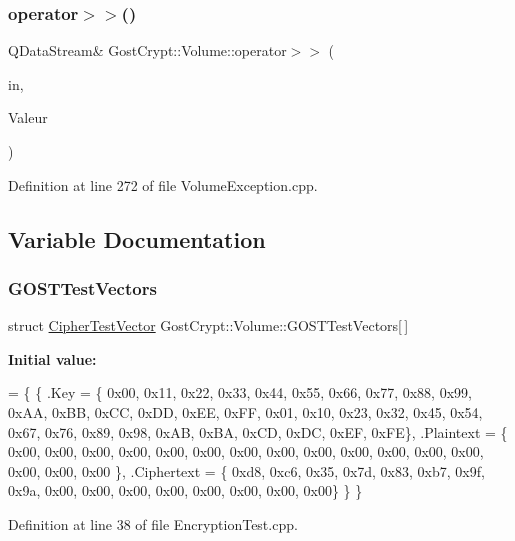 \subsubsection{\texorpdfstring{operator$>$$>$()}{operator>>()}\hspace{0.1cm}{\footnotesize\ttfamily [19/19]}}
{\footnotesize\ttfamily Q\+Data\+Stream\& Gost\+Crypt\+::\+Volume\+::operator$>$$>$ (\begin{DoxyParamCaption}\item[{Q\+Data\+Stream \&}]{in,  }\item[{\hyperlink{class_gost_crypt_1_1_volume_1_1_incorrect_cipher_data_length}{Gost\+Crypt\+::\+Volume\+::\+Incorrect\+Cipher\+Data\+Length} \&}]{Valeur }\end{DoxyParamCaption})}



Definition at line 272 of file Volume\+Exception.\+cpp.



\subsection{Variable Documentation}
\mbox{\label{namespace_gost_crypt_1_1_volume_aa7281bb706851590378d63cf2f730de7}} 
\subsubsection{\texorpdfstring{G\+O\+S\+T\+Test\+Vectors}{GOSTTestVectors}}
{\footnotesize\ttfamily struct \hyperlink{struct_gost_crypt_1_1_volume_1_1_cipher_test_vector}{Cipher\+Test\+Vector} Gost\+Crypt\+::\+Volume\+::\+G\+O\+S\+T\+Test\+Vectors\mbox{[}$\,$\mbox{]}}

{\bfseries Initial value\+:}
\begin{DoxyCode}
=
\{
    \{
        .Key = \{ 0x00, 0x11, 0x22, 0x33, 0x44, 0x55, 0x66, 0x77, 0x88, 0x99, 0xAA, 0xBB, 0xCC, 0xDD, 0xEE, 
      0xFF, 0x01, 0x10, 0x23, 0x32, 0x45, 0x54, 0x67, 0x76, 0x89, 0x98, 0xAB, 0xBA, 0xCD, 0xDC, 0xEF, 0xFE\},
        .Plaintext = \{ 0x00, 0x00, 0x00, 0x00, 0x00, 0x00, 0x00, 0x00, 0x00, 0x00, 0x00, 0x00, 0x00, 0x00, 
      0x00, 0x00 \},
        .Ciphertext = \{ 0xd8, 0xc6, 0x35, 0x7d, 0x83, 0xb7, 0x9f, 0x9a, 0x00, 0x00, 0x00, 0x00, 0x00, 0x00,
       0x00, 0x00\}
    \}
\}
\end{DoxyCode}


Definition at line 38 of file Encryption\+Test.\+cpp.

